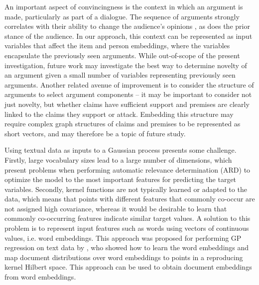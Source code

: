 An important aspect of convincingness is the context in which an argument is made, particularly
as part of a dialogue. The sequence of arguments strongly correlates with their ability to change
the audience's opinions \cite{tan2016winning}, as does the prior stance of the audience\cite{lukin2017argument}. 
In our approach, this context can be represented as input variables that affect the item and person embeddings, where the variables encapsulate the previously seen arguments.
While out-of-scope of the present investigation, future work may investigate the best way to
determine novelty of an argument given a small number of variables representing previously seen arguments.
Another related avenue of improvement is to consider the structure of arguments to select 
argument components -- it may be important to consider not just novelty, but whether claims have 
sufficient support and premises are clearly linked to the claims they support or attack. 
Embedding this structure may require complex graph structures of claims and premises to be represented
as short vectors, and may therefore be a topic of future study. 

Using textual data as inputs to a Gaussian process presents some challenge. 
Firstly, large vocabulary sizes lead to a large number of dimensions, which present problems
when performing automatic relevance determination (ARD) to optimize the model to the most important
features for predicting the target variables. Secondly, kernel functions are not typically learned
or adapted to the data, which means that points with different features that commonly co-occur are
not assigned high covariance, whereas it would be desirable to learn that commonly co-occurring features
indicate similar target values. 
A solution to this problem is to represent input features such as words using vectors of continuous values, i.e. word embeddings. This approach was proposed for performing GP regression on 
text data by \cite{yoshikawa2015non}, who showed how to learn the word embeddings and map document
distributions over word embeddings to points in a reproducing kernel Hilbert space. 
This approach can be used to obtain document embeddings from word embeddings.

